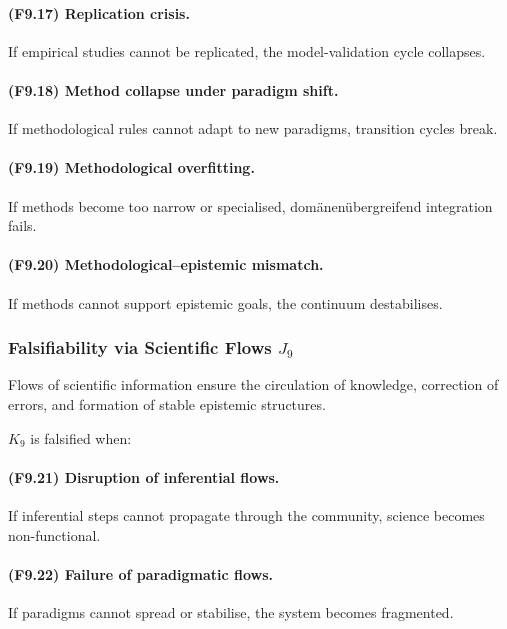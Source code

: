 \paragraph{(F9.17) Replication crisis.}
If empirical studies cannot be replicated,
the model-validation cycle collapses.

\paragraph{(F9.18) Method collapse under paradigm shift.}
If methodological rules cannot adapt to new paradigms,
transition cycles break.

\paragraph{(F9.19) Methodological overfitting.}
If methods become too narrow or specialised,
domänenübergreifend integration fails.

\paragraph{(F9.20) Methodological–epistemic mismatch.}
If methods cannot support epistemic goals,
the continuum destabilises.



\subsubsection{Falsifiability via Scientific Flows \texorpdfstring{$J_9$}{J_9}}

Flows of scientific information ensure the circulation of knowledge,
correction of errors, and formation of stable epistemic structures.

$K_9$ is falsified when:

\paragraph{(F9.21) Disruption of inferential flows.}
If inferential steps cannot propagate through the community,
science becomes non-functional.

\paragraph{(F9.22) Failure of paradigmatic flows.}
If paradigms cannot spread or stabilise,
the system becomes fragmented.


